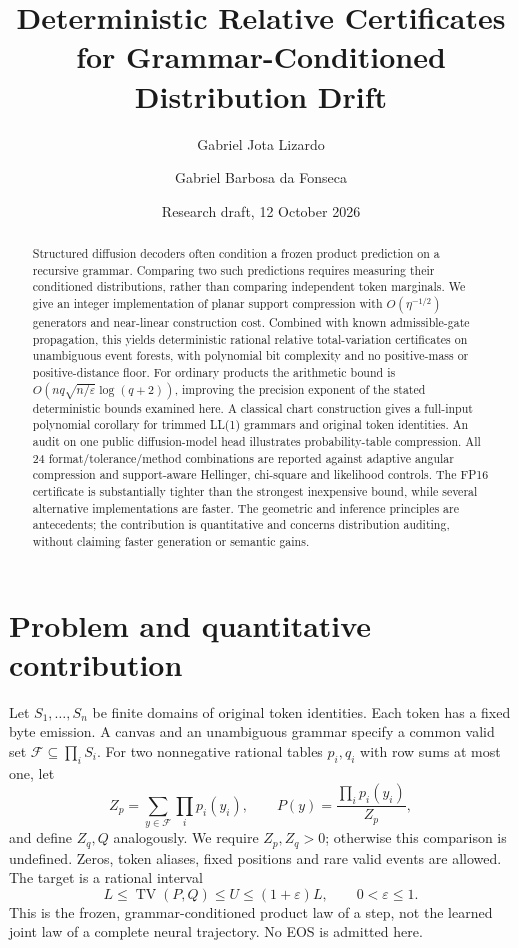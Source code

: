 \documentclass[11pt]{article}
\title{Deterministic Relative Certificates for\newline
Grammar-Conditioned Distribution Drift}
\author{Gabriel Jota Lizardo\and Gabriel Barbosa da Fonseca}
\date{Research draft, 12 October 2026}
\newcommand{\TV}{\operatorname{TV}}
\begin{document}
\maketitle
\begin{abstract}
Structured diffusion decoders often condition a frozen product prediction on
a recursive grammar. Comparing two such predictions requires measuring their
conditioned distributions, rather than comparing independent token marginals.
We give an integer implementation of planar support compression with
$O(\eta^{-1/2})$ generators and near-linear construction cost. Combined with
known admissible-gate propagation, this yields deterministic rational relative
total-variation certificates on unambiguous event forests, with polynomial
bit complexity and no positive-mass or positive-distance floor. For ordinary
products the arithmetic bound is
$O(nq\sqrt{n/\varepsilon}\log(q+2))$, improving the precision
exponent of the stated deterministic bounds examined here. A classical chart
construction gives a full-input polynomial corollary for trimmed LL(1)
grammars and original token identities. An audit on one public diffusion-model
head illustrates probability-table compression. All 24 format/tolerance/method
combinations are reported against adaptive angular compression and support-aware
Hellinger, chi-square and likelihood controls. The FP16 certificate is
substantially tighter than the strongest inexpensive bound, while several
alternative implementations are faster. The geometric and inference
principles are antecedents; the contribution is quantitative and concerns
distribution auditing, without claiming faster generation or semantic gains.
\end{abstract}

\section{Problem and quantitative contribution}
Let $S_1,\ldots,S_n$ be finite domains of original token identities. Each token
has a fixed byte emission. A canvas and an unambiguous grammar specify a
common valid set $\mathcal F\subseteq\prod_i S_i$. For two nonnegative rational
tables $p_i,q_i$ with row sums at most one, let
\[
 Z_p=\sum_{y\in\mathcal F}\prod_i p_i(y_i),\qquad
 P(y)=\frac{\prod_i p_i(y_i)}{Z_p},
\]
and define $Z_q,Q$ analogously. We require $Z_p,Z_q>0$; otherwise this comparison
is undefined. Zeros, token aliases, fixed positions and rare valid events are
allowed. The target is a rational interval
\begin{equation}\label{eq:target}
 L\leq\TV(P,Q)\leq U\leq(1+\varepsilon)L,
 \qquad 0<\varepsilon\leq1.
\end{equation}
This is the frozen, grammar-conditioned product law of a step, not the
learned joint law of a complete neural trajectory. No EOS is admitted here.
\end{document}
